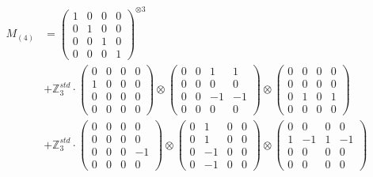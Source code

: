 \documentclass{article}
\newcommand{\Mthree}{%
    M_{(4)}
}
\begin{document}
        \footnotesize{
        \begin{align}
        \Mthree
        &= \label{Rs1-Rc16-Solution-1-c1} \begin{pmatrix} 1 & 0 & 0 & 0 \\ 0 & 1 & 0 & 0 \\ 0 & 0 & 1 & 0 \\ 0 & 0 & 0 & 1 \end{pmatrix}^{\otimes 3} \\
        &+ \label{Rs1-Rc16-Solution-1-c2} \mathbb{Z}_3^{std} \cdot 
            \begin{pmatrix} 0 & 0 & 0 & 0 \\ 1 & 0 & 0 & 0 \\ 0 & 0 & 0 & 0 \\ 0 & 0 & 0 & 0 \end{pmatrix} \otimes 
            \begin{pmatrix} 0 & 0 & 1 & 1 \\ 0 & 0 & 0 & 0 \\ 0 & 0 & -1 & -1 \\ 0 & 0 & 0 & 0 \end{pmatrix} \otimes 
            \begin{pmatrix} 0 & 0 & 0 & 0 \\ 0 & 0 & 0 & 0 \\ 0 & 1 & 0 & 1 \\ 0 & 0 & 0 & 0 \end{pmatrix} \\ 
        &+ \label{Rs1-Rc16-Solution-1-c3} \mathbb{Z}_3^{std} \cdot 
            \begin{pmatrix} 0 & 0 & 0 & 0 \\ 0 & 0 & 0 & 0 \\ 0 & 0 & 0 & -1 \\ 0 & 0 & 0 & 0 \end{pmatrix} \otimes 
            \begin{pmatrix} 0 & 1 & 0 & 0 \\ 0 & 1 & 0 & 0 \\ 0 & -1 & 0 & 0 \\ 0 & -1 & 0 & 0 \end{pmatrix} \otimes 
            \begin{pmatrix} 0 & 0 & 0 & 0 \\ 1 & -1 & 1 & -1 \\ 0 & 0 & 0 & 0 \\ 0 & 0 & 0 & 0 \end{pmatrix} \\ 

\end{align}}
\end{document}

